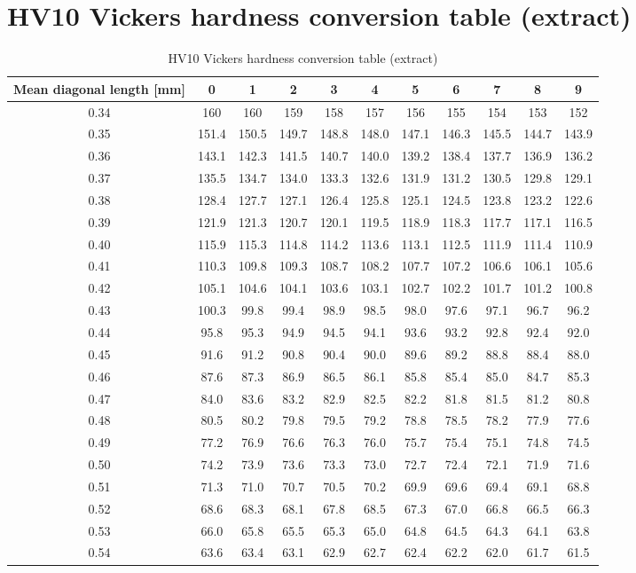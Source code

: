 
\chapter{HV10 Vickers hardness conversion table (extract)} %

\label{AppendixB} %

\begin{center}
\begin{table}[ht]
\begin{tabular}{|c|c |c |c| c|c|c|c|c|c|c|}
    \hline
    Mean diagonal length [mm] & 0 &1&2&3&4&5&6&7&8&9\\
\hline 
\hline   
    0.34 & 160 &160&159&158&157&156&155&154&153&152\\
    0.35&151.4&150.5&149.7&148.8&148.0&147.1&146.3&145.5&144.7&143.9\\ 
    0.36&143.1&142.3&141.5&140.7&140.0&139.2&138.4&137.7&136.9&136.2\\
    0.37&135.5&134.7&134.0&133.3&132.6&131.9&131.2&130.5&129.8&129.1\\
    0.38&128.4&127.7&127.1&126.4&125.8&125.1&124.5&123.8&123.2&122.6\\
    0.39&121.9&121.3&120.7&120.1&119.5&118.9&118.3&117.7&117.1&116.5\\
    0.40&115.9&115.3&114.8&114.2&113.6&113.1&112.5&111.9&111.4&110.9\\
    0.41&110.3&109.8&109.3&108.7&108.2&107.7&107.2&106.6&106.1&105.6\\
    0.42&105.1&104.6&104.1&103.6&103.1&102.7&102.2&101.7&101.2&100.8\\
    0.43&100.3&99.8&99.4&98.9&98.5&98.0&97.6&97.1&96.7&96.2\\
    0.44&95.8&95.3&94.9&94.5&94.1&93.6&93.2&92.8&92.4&92.0\\
    0.45&91.6&91.2&90.8&90.4&90.0&89.6&89.2&88.8&88.4&88.0\\
    0.46&87.6&87.3&86.9&86.5&86.1&85.8&85.4&85.0&84.7&85.3\\
    0.47&84.0&83.6&83.2&82.9&82.5&82.2&81.8&81.5&81.2&80.8\\
    0.48&80.5&80.2&79.8&79.5&79.2&78.8&78.5&78.2&77.9&77.6\\
    0.49&77.2&76.9&76.6&76.3&76.0&75.7&75.4&75.1&74.8&74.5\\
    0.50&74.2&73.9&73.6&73.3&73.0&72.7&72.4&72.1&71.9&71.6\\
    0.51&71.3&71.0&70.7&70.5&70.2&69.9&69.6&69.4&69.1&68.8\\
    0.52&68.6&68.3&68.1&67.8&68.5&67.3&67.0&66.8&66.5&66.3\\
    0.53&66.0&65.8&65.5&65.3&65.0&64.8&64.5&64.3&64.1&63.8\\
    0.54&63.6&63.4&63.1&62.9&62.7&62.4&62.2&62.0&61.7&61.5\\    \hline
\end{tabular}

\caption[HV10 Vickers hardness conversion table (extract)]{HV10 Vickers hardness conversion table (extract)}
\label{tab:compo}
\end{table}
 \end{center}
